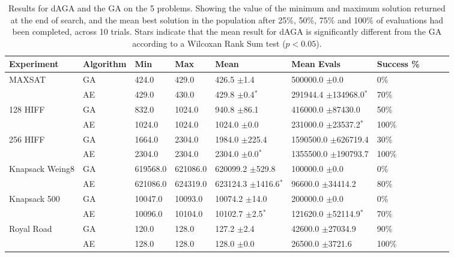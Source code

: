 \documentclass[runningheads,a4paper]{llncs}
\begin{document}
 \begin{table}[t!]
    \begin{tabular}{ | p{1.8cm} | l | l | l | l | l | l | l | l | p{1cm} |}
    \hline
    Experiment & Algorithm & Min & Max & Mean & Mean Evals & Success \%\\ \hline
MAXSAT & GA & 424.0 & 429.0 & 426.5 \(\pm\)1.4 & 500000.0 \(\pm\)0.0 & 0\%\\
& AE & 429.0 & 430.0 & 429.8 \(\pm\)0.4\(^*\) & 291944.4 \(\pm\)134968.0\(^*\) & 70\%\\\hline
128 HIFF & GA & 832.0 & 1024.0 & 940.8 \(\pm\)86.1 & 416000.0 \(\pm\)87430.0 & 50\%\\
& AE & 1024.0 & 1024.0 & 1024.0 \(\pm\)0.0 & 231000.0 \(\pm\)23537.2\(^*\) & 100\%\\\hline
256 HIFF & GA & 1664.0 & 2304.0 & 1984.0 \(\pm\)225.4 & 1590500.0 \(\pm\)626719.4 & 30\%\\
& AE & 2304.0 & 2304.0 & 2304.0 \(\pm\)0.0\(^*\) & 1355500.0 \(\pm\)190793.7 & 100\%\\\hline
Knapsack Weing8 & GA & 619568.0 & 621086.0 & 620099.2 \(\pm\)529.8 & 100000.0 \(\pm\)0.0 & 0\%\\
& AE & 621086.0 & 624319.0 & 623124.3 \(\pm\)1416.6\(^*\) & 96600.0 \(\pm\)34414.2 & 80\%\\\hline
Knapsack 500 & GA & 10047.0 & 10093.0 & 10074.2 \(\pm\)14.0 & 200000.0 \(\pm\)0.0 & 0\%\\
& AE & 10096.0 & 10104.0 & 10102.7 \(\pm\)2.5\(^*\) & 121620.0 \(\pm\)52114.9\(^*\) & 70\%\\\hline
Royal Road & GA & 120.0 & 128.0 & 127.2 \(\pm\)2.4 & 42600.0 \(\pm\)27034.9 & 90\%\\
& AE & 128.0 & 128.0 & 128.0 \(\pm\)0.0 & 26500.0 \(\pm\)3721.6 & 100\%\\\hline
    \end{tabular}
    \label{table:main_results}
    \caption{Results for dAGA and the GA on the 5 problems. Showing the value of the minimum and maximum solution returned at the end of search, and the mean best solution in the population after 25\%, 50\%, 75\% and 100\% of evaluations had been completed, across 10 trials. Stars indicate that the mean result for dAGA is significantly different from the GA according to a Wilcoxan Rank Sum test (\(p<0.05\)).}
\end{table}
\end{document}
